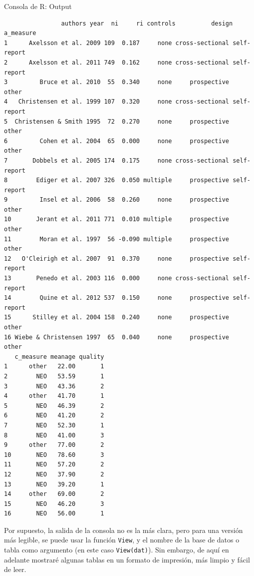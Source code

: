 \documentclass[
  bookmarksnumbered]{article}
\begin{document}
\begin{ROut}{Consola de R: Output~\thetcbcounter}
                \begin{footnotesize}
                \begin{verbatim}                authors year  ni     ri controls          design   a_measure
1      Axelsson et al. 2009 109  0.187     none cross-sectional self-report
2      Axelsson et al. 2011 749  0.162     none cross-sectional self-report
3         Bruce et al. 2010  55  0.340     none     prospective       other
4   Christensen et al. 1999 107  0.320     none cross-sectional self-report
5  Christensen & Smith 1995  72  0.270     none     prospective       other
6         Cohen et al. 2004  65  0.000     none     prospective       other
7       Dobbels et al. 2005 174  0.175     none cross-sectional self-report
8        Ediger et al. 2007 326  0.050 multiple     prospective self-report
9         Insel et al. 2006  58  0.260     none     prospective       other
10       Jerant et al. 2011 771  0.010 multiple     prospective       other
11        Moran et al. 1997  56 -0.090 multiple     prospective       other
12   O'Cleirigh et al. 2007  91  0.370     none     prospective self-report
13       Penedo et al. 2003 116  0.000     none cross-sectional self-report
14        Quine et al. 2012 537  0.150     none     prospective self-report
15      Stilley et al. 2004 158  0.240     none     prospective       other
16 Wiebe & Christensen 1997  65  0.040     none     prospective       other
   c_measure meanage quality
1      other   22.00       1
2        NEO   53.59       1
3        NEO   43.36       2
4      other   41.70       1
5        NEO   46.39       2
6        NEO   41.20       2
7        NEO   52.30       1
8        NEO   41.00       3
9      other   77.00       2
10       NEO   78.60       3
11       NEO   57.20       2
12       NEO   37.90       2
13       NEO   39.20       1
14     other   69.00       2
15       NEO   46.20       3
16       NEO   56.00       1
 \end{verbatim}
                \end{footnotesize}
                \end{ROut}

Por supuesto, la salida de la consola no es la más clara, pero para una versión más legible, se puede usar la función \texttt{View}, y el nombre de la base de datos o tabla como argumento (en este caso \texttt{View(dat)}). Sin embargo, de aquí en adelante mostraré algunas tablas en un formato de impresión, más limpio y fácil de leer.
\end{document}
